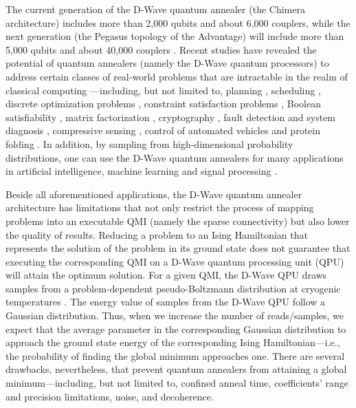 \documentclass[fleqn,10pt]{wlscirep}
\begin{document}
The current generation of the D-Wave quantum annealer (the Chimera architecture) includes more than 2,000 qubits and about 6,000 couplers, while the next generation (the Pegasus topology of the Advantage) will include more than 5,000 qubits and about 40,000 couplers \cite{boothby2019next}. Recent studies have revealed the potential of quantum annealers (namely the D-Wave quantum processors) to address certain classes of real-world problems that are intractable in the realm of classical computing \cite{biswas2017nasa}—including, but not limited to, planning \cite{rieffel2015case}, scheduling \cite{venturelli2015quantum,tran2016hybrid}, discrete optimization problems \cite{bian2014discrete}, constraint satisfaction problems \cite{bian2016mapping}, Boolean satisfiability \cite{su2016quantum,bian2017solving}, matrix factorization \cite{o2018nonnegative}, cryptography \cite{peng2019factoring}, fault detection and system diagnosis \cite{perdomo2015quantum}, compressive sensing \cite{ayanzadeh2019quantum}, control of automated vehicles \cite{ohzeki2018control} and protein folding \cite{perdomo2012finding}. In addition, by sampling from high-dimensional probability distributions, one can use the D-Wave quantum annealers for many applications in artificial intelligence, machine learning and signal processing \cite{biswas2017nasa,adachi2015application,vinci2019path}. 

Beside all aforementioned applications, the D-Wave quantum annealer architecture has limitations that not only restrict the process of mapping problems into an executable QMI (namely the sparse connectivity) but also lower the quality of results. Reducing a problem to an Ising Hamiltonian that represents the solution of the problem in its ground state does not guarantee that executing the corresponding QMI on a D-Wave quantum processing unit (QPU) will attain the optimum solution. For a given QMI, the D-Wave QPU draws samples from a problem-dependent pseudo-Boltzmann distribution at cryogenic temperatures \cite{biswas2017nasa}. The energy value of samples from the D-Wave QPU follow a Gaussian distribution. Thus, when we increase the number of reads/samples, we expect that the average parameter in the corresponding Gaussian distribution to approach the ground state energy of the corresponding Ising Hamiltonian—i.e., the probability of finding the global minimum approaches one. There are several drawbacks, nevertheless, that prevent quantum annealers from attaining a global minimum—including, but not limited to, confined anneal time, coefficients’ range and precision limitations, noise, and decoherence.
\end{document}
